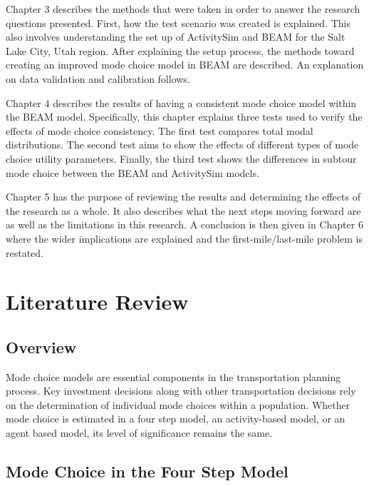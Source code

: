 \documentclass[12pt, oneside, openright]{byuthesis}
\begin{document}
Chapter 3 describes the methods that were taken in order to answer the research questions presented. First, how the test scenario was created is explained. This also involves understanding the set up of ActivitySim and BEAM for the Salt Lake City, Utah region. After explaining the setup process, the methods toward creating an improved mode choice model in BEAM are described. An explanation on data validation and calibration follows.

Chapter 4 describes the results of having a consistent mode choice model within the BEAM model. Specifically, this chapter explains three tests used to verify the effects of mode choice consistency. The first test compares total modal distributions. The second test aims to show the effects of different types of mode choice utility parameters. Finally, the third test shows the differences in subtour mode choice between the BEAM and ActivitySim models.

Chapter 5 has the purpose of reviewing the results and determining the effects of the research as a whole. It also describes what the next steps moving forward are as well as the limitations in this research. A conclusion is then given in Chapter 6 where the wider implications are explained and the first-mile/last-mile problem is restated.

\hypertarget{literature-review}{%
\chapter{Literature Review}\label{literature-review}}

\hypertarget{overview}{%
\section{Overview}\label{overview}}

Mode choice models are essential components in the transportation planning process. Key investment decisions along with other transportation decisions rely on the determination of individual mode choices within a population. Whether mode choice is estimated in a four step model, an activity-based model, or an agent based model, its level of significance remains the same.

\hypertarget{lit1}{%
\section{Mode Choice in the Four Step Model}\label{lit1}}
\end{document}
